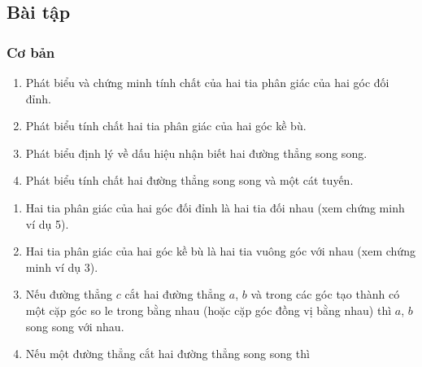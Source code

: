 \subsection{Bài tập}
\subsubsection{Cơ bản}
\begin{bt}%
\begin{enumerate}
\item Phát biểu và chứng minh tính chất của hai tia phân giác của hai góc đối đỉnh.
\item Phát biểu tính chất hai tia phân giác của hai góc kề bù.
\item Phát biểu định lý về dấu hiệu nhận biết hai đường thẳng song song.
\item  Phát biểu tính chất hai đường thẳng song song  và một cát tuyến.
\end{enumerate}	
\loigiai
	{
	\begin{enumerate}
		\item Hai tia phân giác của hai góc đối đỉnh là hai tia đối nhau (xem chứng minh ví dụ 5).
		\item Hai tia phân giác của hai góc kề bù là hai tia vuông góc với nhau (xem chứng minh ví dụ 3).
		\item Nếu đường thẳng $c$ cắt hai đường thẳng $a$, $b$ và trong các góc tạo thành có một cặp góc so le trong bằng nhau (hoặc cặp góc đồng vị bằng nhau) thì $a$, $b$ song song với nhau.
		\item Nếu một đường thẳng cắt hai đường thẳng song song thì 
	\end{enumerate}
	}
\end{bt}

